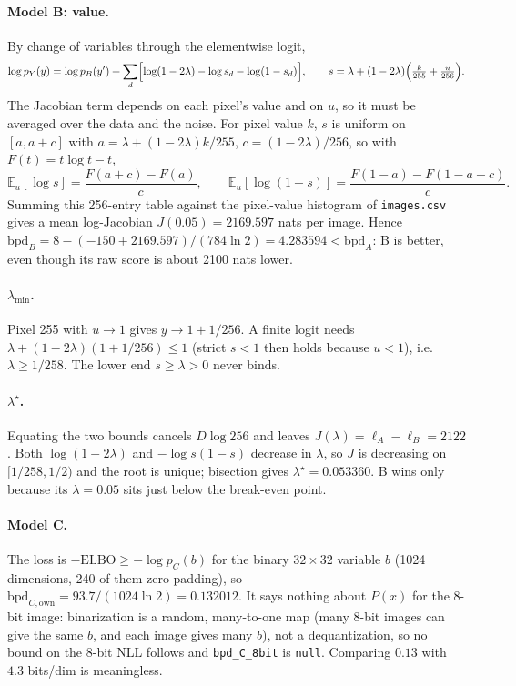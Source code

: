 \documentclass[11pt]{article}
\newcommand{\E}{\mathbb{E}}
\begin{document}
\paragraph{Model B: value.} By change of variables through the elementwise logit,
\[
  \log p_Y(y)=\log p_B(y')+\sum_{d}\Bigl[\log(1-2\lambda)-\log s_d-\log(1-s_d)\Bigr],
  \qquad s=\lambda+(1-2\lambda)\Bigl(\tfrac{k}{255}+\tfrac{u}{256}\Bigr).
\]
The Jacobian term depends on each pixel's value and on \(u\), so it must be
averaged over the data and the noise. For pixel value \(k\), \(s\) is uniform
on \([a,a+c]\) with \(a=\lambda+(1-2\lambda)k/255\), \(c=(1-2\lambda)/256\),
so with \(F(t)=t\log t-t\),
\[
  \E_u[\log s]=\frac{F(a+c)-F(a)}{c},\qquad
  \E_u[\log(1-s)]=\frac{F(1-a)-F(1-a-c)}{c}.
\]
Summing this 256-entry table against the pixel-value histogram of
\texttt{images.csv} gives a mean log-Jacobian \(J(0.05)=2169.597\) nats per
image. Hence
\(\mathrm{bpd}_B=8-(-150+2169.597)/(784\ln2)=4.283594<\mathrm{bpd}_A\):
B is better, even though its raw score is about 2100 nats lower.

\paragraph{\(\lambda_{\min}\).} Pixel 255 with \(u\to1\) gives
\(y\to1+1/256\). A finite logit needs
\(\lambda+(1-2\lambda)(1+1/256)\le1\) (strict \(s<1\) then holds because
\(u<1\)), i.e.\ \(\lambda\ge1/258\). The lower end \(s\ge\lambda>0\) never
binds.

\paragraph{\(\lambda^\star\).} Equating the two bounds cancels
\(D\log256\) and leaves \(J(\lambda)=\ell_A-\ell_B=2122\). Both
\(\log(1-2\lambda)\) and \(-\log s(1-s)\) decrease in \(\lambda\), so
\(J\) is decreasing on \([1/258,1/2)\) and the root is unique; bisection gives
\(\lambda^\star=0.053360\). B wins only because its \(\lambda=0.05\) sits just
below the break-even point.

\paragraph{Model C.} The loss is \(-\mathrm{ELBO}\ge-\log p_C(b)\) for the
binary \(32\times32\) variable \(b\) (1024 dimensions, 240 of them zero
padding), so \(\mathrm{bpd}_{C,\text{own}}=93.7/(1024\ln2)=0.132012\). It says
nothing about \(P(x)\) for the 8-bit image: binarization is a random,
many-to-one map (many 8-bit images can give the same \(b\), and each image
gives many \(b\)), not a dequantization, so no bound on the 8-bit NLL follows
and \texttt{bpd\_C\_8bit} is \texttt{null}. Comparing \(0.13\) with \(4.3\)
bits/dim is meaningless.
\end{document}
